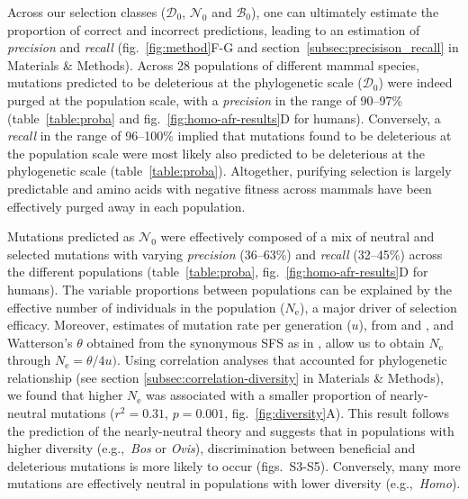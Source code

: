 \documentclass{article}
\newcommand{\Ne}{N_{\text{e}}}
\newcommand{\SphyDel}{\mathcal{D}_0}
\newcommand{\SphyNeu}{\mathcal{N}_0}
\newcommand{\SphyBen}{\mathcal{B}_0}
\begin{document}
    Across our selection classes ($\SphyDel$, $\SphyNeu$ and $\SphyBen$), one can ultimately estimate the proportion of correct and incorrect predictions, leading to an estimation of \textit{precision} and \textit{recall} (fig.~\ref{fig:method}F-G and section~\ref{subsec:precisison_recall} in Materials \& Methods).
    Across 28 populations of different mammal species, mutations predicted to be deleterious at the phylogenetic scale ($\SphyDel$) were indeed purged at the population scale, with a \textit{precision} in the range of 90--97\% (table~\ref{table:proba} and fig.~\ref{fig:homo-afr-results}D for humans).
    Conversely, a \textit{recall} in the range of 96--100\% implied that mutations found to be deleterious at the population scale were most likely also predicted to be deleterious at the phylogenetic scale (table~\ref{table:proba}).
    Altogether, purifying selection is largely predictable and amino acids with negative fitness across mammals have been effectively purged away in each population.

    Mutations predicted as $\SphyNeu$ were effectively composed of a mix of neutral and selected mutations with varying \textit{precision} (36--63\%) and \textit{recall} (32--45\%) across the different populations (table~\ref{table:proba}, fig.~\ref{fig:homo-afr-results}D for humans).
    The variable proportions between populations can be explained by the effective number of individuals in the population ($\Ne$), a major driver of selection efficacy.
    Moreover, estimates of mutation rate per generation ($u$), from \textcite{bergeron_evolution_2023} and \textcite{orlando_recalibrating_2013}, and Watterson’s $\theta$ obtained from the synonymous SFS as in \textcite{achaz_frequency_2009}, allow us to obtain $\Ne$ through $\Ne=\theta/4 u)$.
    Using correlation analyses that accounted for phylogenetic relationship (see section \ref{subsec:correlation-diversity} in Materials \& Methods), we found that higher $\Ne$ was associated with a smaller proportion of nearly-neutral mutations ($r^2=0.31$, $p=0.001$, fig.~\ref{fig:diversity}A).
    This result follows the prediction of the nearly-neutral theory and suggests that in populations with higher diversity (e.g.,~\textit{Bos} or \textit{Ovis}), discrimination between beneficial and deleterious mutations is more likely to occur (figs.~S3-S5).
    Conversely, many more mutations are effectively neutral in populations with lower diversity (e.g.,~\textit{Homo}).
\end{document}
